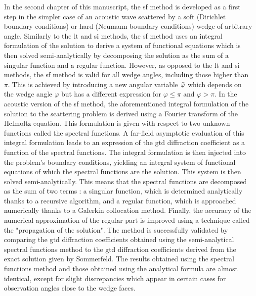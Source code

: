 In the second chapter of this manuscript, the \acrfull{sf} method is developed as a first step in the simpler case of an acoustic wave scattered by a soft (Dirichlet boundary conditions) or hard (Neumann boundary conditions) wedge of arbitrary angle. Similarly to the \acrshort{lt} and \acrshort{si} methods, the \acrshort{sf} method uses an integral formulation of the solution to derive a system of functional equations which is then solved semi-analytically by decomposing the solution as the sum of a singular function and a regular function. However, as opposed to the \acrshort{lt} and \acrshort{si} methods, the \acrshort{sf} method is valid for all wedge angles, including those higher than $\pi$. This is achieved by introducing a new angular variable $\tilde{\varphi}$ which depends on the wedge angle $\varphi$ but has a different expression for $\varphi \leq \pi$ and $\varphi>\pi$. In the acoustic version of the \acrshort{sf} method, the aforementioned integral formulation of the solution to the scattering problem is derived using a Fourier transform of the Helmoltz equation. This formulation is given with respect to two unknown functions called the spectral functions. A far-field asymptotic evaluation of this integral formulation leads to an expression of the \acrshort{gtd} diffraction coefficient as a function of the spectral functions. The integral formulation is then injected into the problem's boundary conditions, yielding an integral system of functional equations of which the spectral functions are the solution. This system is then solved semi-analytically. This means that the spectral functions are decomposed as the sum of two terms : a singular function, which is determined analytically thanks to a recursive algorithm, and a regular function, which is approached numerically thanks to a Galerkin collocation method. Finally, the accuracy of the numerical approximation of the regular part is improved using a technique called the "propagation of the solution". The method is successfully validated by comparing the \acrshort{gtd} diffraction coefficients obtained using the semi-analytical spectral functions method to the \acrshort{gtd} diffraction coefficients derived from the exact solution given by Sommerfeld. The results obtained using the spectral functions method and those obtained using the analytical formula are almost identical, except for slight discrepancies which appear in certain cases for observation angles close to the wedge faces.

